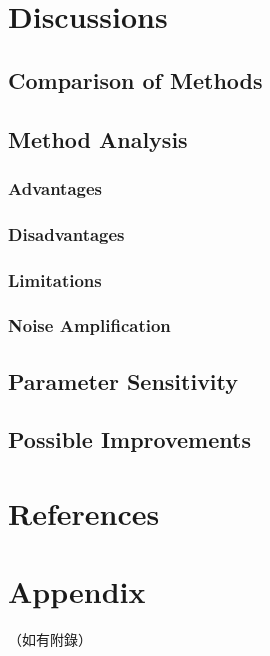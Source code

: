 \documentclass[12pt,a4paper]{article}
\begin{document}
\section{Discussions}
\subsection{Comparison of Methods}
\subsection{Method Analysis}
\subsubsection{Advantages}\subsubsection{Disadvantages}\subsubsection{Limitations}\subsubsection{Noise Amplification}
\subsection{Parameter Sensitivity}
\subsection{Possible Improvements}

\section{References}



\section{Appendix}
（如有附錄）
\end{document}
